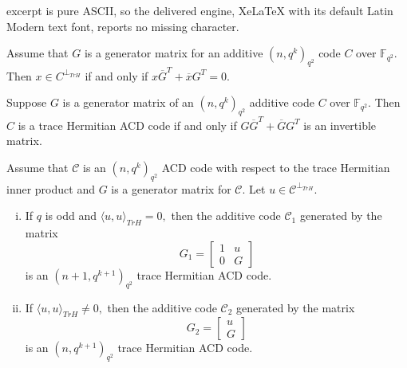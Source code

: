 \documentclass[10pt,a4paper]{amsart}
\begin{document}
excerpt is pure ASCII, so the delivered engine, XeLaTeX with its default Latin Modern text font, reports no missing character.
\begin{proposition}\label{xinperp}
	Assume that $G$ is a generator matrix for an additive $(n,q^k)_{q^2}$ code $C$ over $\mathbb{F}_{q^2}$. Then $x\in C^{\perp_{TrH}} $ if and only if $x\overline{G}^T+\overline{x}G^T=0.$
\end{proposition}

\begin{theorem} \label{hermitian acd}
	Suppose $G$ is a generator matrix of an $(n,q^k)_{q^2}$ additive code $C$ over $\mathbb{F}_{q^2}.$ Then $C$ is  a trace Hermitian ACD  code if and only if $G\overline{G}^T+\overline{G}G^T$ is an invertible matrix.
\end{theorem}

\begin{theorem}\label{conshermitian}
	Assume that $\mathcal{C}$ is an $(n,q^k)_{q^2}$ ACD code  with respect to the trace Hermitian inner product and $G$ is a  generator matrix for $\mathcal{C}.$  Let $u\in \mathcal{C}^{\perp_{TrH}}.$ 
	\begin{enumerate}[(i)]
		\item If $q$ is odd and $\langle u,u\rangle_{TrH}=0,$ then the additive code $\mathcal{C}_1$ generated by the matrix 
		$$G_1=\begin{bmatrix}
			1 & u\\
			0 & G
		\end{bmatrix}$$
		is an $(n+1,q^{k+1})_{q^2}$  trace Hermitian ACD code.
		\item  If $\langle u,u\rangle_{TrH}\neq 0,$ then the additive code $\mathcal{C}_2$ generated by the matrix 
		$$G_2=\begin{bmatrix}
			u\\
			G
		\end{bmatrix}$$
		is an $(n,q^{k+1})_{q^2}$  trace Hermitian ACD code.
		
	\end{enumerate}
\end{theorem}
\end{document}
